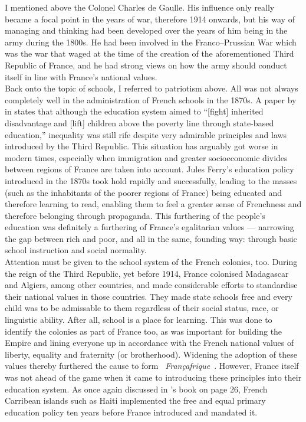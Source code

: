 \documentclass[12pt]{article}
\begin{document}
I mentioned above the Colonel Charles de Gaulle. His influence only
really became a focal point in the years of war, therefore 1914
onwards, but his way of managing and thinking had been developed over
the years of him being in the army during the 1800s. He had been
involved in the Franco--Prussian War which was the war that waged at
the time of the creation of the aforementioned Third Republic of
France, and he had strong views on how the army should conduct itself
in line with France's national values.\\

Back onto the topic of schools, I referred to patriotism above. All
was not always completely well in the administration of French schools
in the 1870s. A paper by \citeauthor{republican-school-pressure} in
\citeyear{republican-school-pressure} states that although the
education system aimed to ``[fight] inherited disadvantage and [lift]
children above the poverty line through state-based education,''
inequality was still rife despite very admirable principles and laws
introduced by the Third Republic. This situation has arguably got
worse in modern times\cite{higher-education-modern}, especially when
immigration and greater socioeconomic divides between regions of
France are taken into account. Jules Ferry's education policy
introduced in the 1870s took hold rapidly and successfully, leading to
the masses (such as the inhabitants of the poorer regions of France)
being educated and therefore learning to read, enabling them to feel a
greater sense of Frenchness and therefore belonging through
propaganda. This furthering of the people's education was definitely a
furthering of France's egalitarian values --- narrowing the gap
between rich and poor, and all in the same, founding way: through
basic school instruction and social normality.\\

Attention must be given to the school system of the French colonies,
too. During the reign of the Third Republic, yet before 1914, France
colonised Madagascar and Algiers, among other countries, and made
considerable efforts to standardise their national values in those
countries. They made state schools free and every child was to be
admissable to them regardless of their social status, race, or
linguistic ability\cite[p.~26]{colony-schools}. After all, school is a
place for learning. This was done to identify the colonies as part of
France too, as was important for building the Empire and lining
everyone up in accordance with the French national values of liberty,
equality and fraternity (or brotherhood). Widening the adoption of
these values thereby furthered the cause to form
\guillemotleft~\textit{Françafrique}~\guillemotright. However, France
itself was not ahead of the game when it came to introducing these
principles into their education system. As once again discussed in
\citeauthor{colony-schools}'s book on page 26, French Carribean
islands such as Haiti implemented the free and equal primary education
policy ten years before France introduced and mandated it.\\
\end{document}
